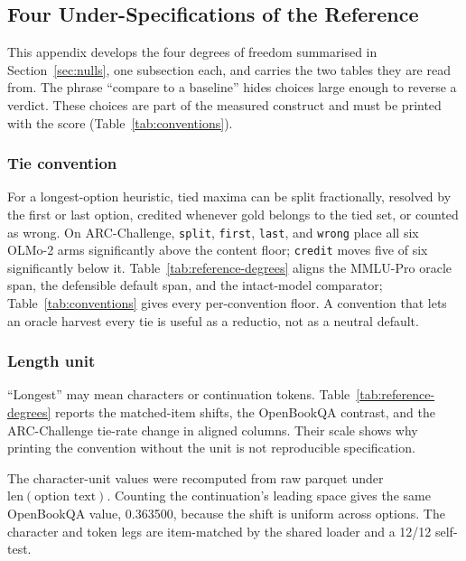 \subsection{Four Under-Specifications of the Reference}
\label{app:nulls}

This appendix develops the four degrees of freedom summarised in Section~\ref{sec:nulls}, one subsection each, and carries the two tables they are read from. The phrase ``compare to a baseline'' hides choices large enough to reverse a verdict. These choices are part of the measured construct and must be printed with the score (Table~\ref{tab:conventions}).

\subsubsection{Tie convention}

For a longest-option heuristic, tied maxima can be split fractionally, resolved by the first or last option, credited whenever gold belongs to the tied set, or counted as wrong. On ARC-Challenge, \texttt{split}, \texttt{first}, \texttt{last}, and \texttt{wrong} place all six OLMo-2 arms significantly above the content floor; \texttt{credit} moves five of six significantly below it. Table~\ref{tab:reference-degrees} aligns the MMLU-Pro oracle span, the defensible default span, and the intact-model comparator; Table~\ref{tab:conventions} gives every per-convention floor. A convention that lets an oracle harvest every tie is useful as a reductio, not as a neutral default.

\subsubsection{Length unit}

``Longest'' may mean characters or continuation tokens. Table~\ref{tab:reference-degrees} reports the matched-item shifts, the OpenBookQA contrast, and the ARC-Challenge tie-rate change in aligned columns. Their scale shows why printing the convention without the unit is not reproducible specification.

The character-unit values were recomputed from raw parquet under $\mathrm{len}(\text{option text})$. Counting the continuation's leading space gives the same OpenBookQA value, 0.363500, because the shift is uniform across options. The character and token legs are item-matched by the shared loader and a 12/12 self-test.

